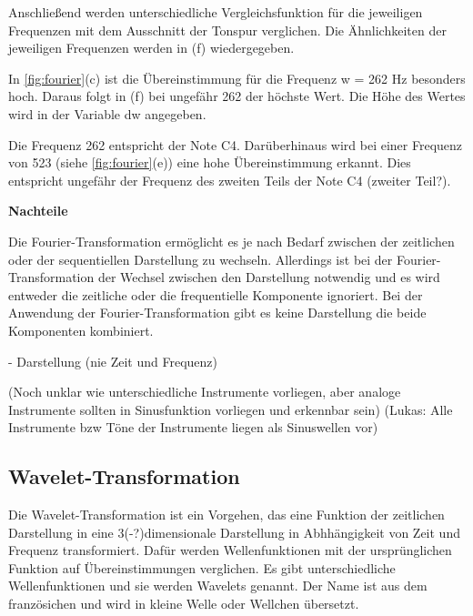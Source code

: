 Anschließend werden unterschiedliche Vergleichsfunktion für die jeweiligen Frequenzen mit dem Ausschnitt der Tonspur verglichen. Die Ähnlichkeiten der jeweiligen Frequenzen werden in (f) wiedergegeben.

\par

In \cref{fig:fourier}(c) ist die Übereinstimmung für die Frequenz w = 262 Hz besonders hoch. Daraus folgt in (f) bei ungefähr 262 der höchste Wert. Die Höhe des Wertes wird in der Variable dw angegeben.


\par

Die Frequenz 262 entspricht der Note C4. Darüberhinaus wird bei einer Frequenz von 523 (siehe \cref{fig:fourier}(e)) eine hohe Übereinstimmung erkannt. Dies entspricht ungefähr der Frequenz des zweiten Teils der Note C4 (zweiter Teil?).

%
\textbf{Nachteile}
%
    
Die Fourier-Transformation ermöglicht es je nach Bedarf zwischen der zeitlichen oder der sequentiellen Darstellung zu wechseln. Allerdings ist bei der Fourier-Transformation der Wechsel zwischen den Darstellung notwendig und es wird entweder die zeitliche oder die frequentielle Komponente ignoriert. Bei der Anwendung der Fourier-Transformation gibt es keine Darstellung die beide Komponenten kombiniert.

    - Darstellung (nie Zeit und Frequenz)

(Noch unklar wie unterschiedliche Instrumente vorliegen, aber analoge Instrumente sollten in Sinusfunktion vorliegen und erkennbar sein)
(Lukas: Alle Instrumente bzw Töne der Instrumente liegen als Sinuswellen vor)

%
\subsection{Wavelet-Transformation}
\label{wavelet-transformation}
%

Die Wavelet-Transformation ist ein Vorgehen, das eine Funktion der zeitlichen Darstellung in eine 3(-?)dimensionale Darstellung in Abhhängigkeit von Zeit und Frequenz transformiert. Dafür werden Wellenfunktionen mit der ursprünglichen Funktion auf Übereinstimmungen verglichen. Es gibt unterschiedliche Wellenfunktionen und sie werden Wavelets genannt. Der Name ist aus dem französichen und wird in kleine Welle oder Wellchen übersetzt.

\par

